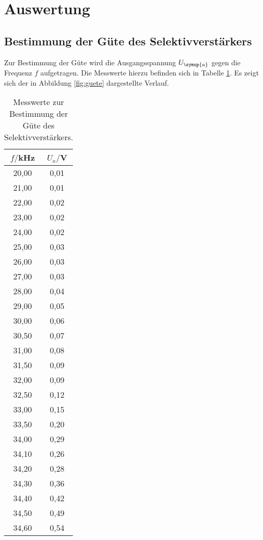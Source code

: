 \section{Auswertung}
\label{sec:Auswertung}

\subsection{Bestimmung der Güte des Selektivverstärkers}
\label{subsec:guete}

Zur Bestimmung der Güte wird die Ausgangsspannung $U_{\symup{a}}$ gegen die Frequenz
$f$ aufgetragen. Die Messwerte hierzu befinden sich in Tabelle \ref{tab:guete}.
Es zeigt sich der in Abbildung \ref{fig:guete} dargestellte Verlauf.

\begin{table}[htp]
	\begin{center}
    \caption{Messwerte zur Bestimmung der Güte des Selektivverstärkers.}
    \label{tab:guete}
		\begin{tabular}{cc}
		\toprule
			{$f/$kHz} & {$U_a/$V}\\
			\midrule
			20,00 & 0,01\\
			21,00 & 0,01\\
			22,00 & 0,02\\
			23,00 & 0,02\\
			24,00 & 0,02\\
			25,00 & 0,03\\
			26,00 & 0,03\\
			27,00 & 0,03\\
			28,00 & 0,04\\
			29,00 & 0,05\\
			30,00 & 0,06\\
			30,50 & 0,07\\
			31,00 & 0,08\\
			31,50 & 0,09\\
			32,00 & 0,09\\
			32,50 & 0,12\\
			33,00 & 0,15\\
			33,50 & 0,20\\
			34,00 & 0,29\\
			34,10 & 0,26\\
			34,20 & 0,28\\
			34,30 & 0,36\\
			34,40 & 0,42\\
			34,50 & 0,49\\
			34,60 & 0,54\\

\end{tabular}
\end{center}
\end{table}
